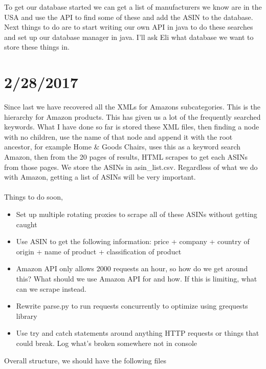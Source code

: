 \documentclass[12pt]{article}
\begin{document}
To get our database started we can get a list of manufacturers we know are in the USA and use the API to find some of these and add the ASIN to the database. Next things to do are to start writing our own API in java to do these searches and set up our database manager in java. I'll ask Eli what database we want to store these things in.

\section*{2/28/2017}
Since last we have recovered all the XMLs for Amazons subcategories. This is the hierarchy for Amazon products. This has given us a lot of the frequently searched keywords. What I have done so far is stored these XML files, then finding a node with no children, use the name of that node and append it with the root ancestor, for example Home \& Goods Chairs, uses this as a keyword search Amazon, then from the 20 pages of results, HTML scrapes to get each ASINs from those pages. We store the ASINs in asin_list.csv. Regardless of what we do with Amazon, getting a list of ASINs will be very important. \\ \\
Things to do soon,

\begin{itemize}
	\item Set up multiple rotating proxies to scrape all of these ASINs without getting caught
	\item Use ASIN to get the following information: price + company + country of origin + name of product + classification of product
	\item Amazon API only allows 2000 requests an hour, so how do we get around this? What should we use Amazon API for and how. If this is limiting, what can we scrape instead.
	\item Rewrite parse.py to run requests concurrently to optimize using grequests library
	\item Use try and catch statements around anything HTTP requests or things that could break. Log what's broken somewhere not in console
\end{itemize}

Overall structure, we should have the following files
\end{document}

